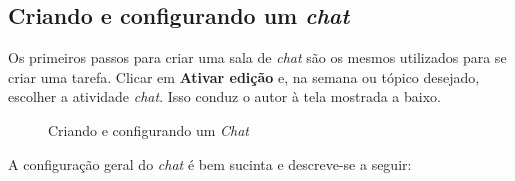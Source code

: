 \subsection{Criando e configurando um \textit{chat}}

Os primeiros passos para criar uma sala de \textit{chat }são os mesmos utilizados para se criar uma tarefa. Clicar em \textbf{Ativar edição} e, na semana ou tópico desejado, escolher a atividade \textit{chat}. Isso conduz o autor à tela mostrada a baixo.

\begin{figure}[htbp]
 \begin{center}
  \caption{Criando e configurando um \textit{Chat}}
  \label{fig:cap5_12}
 \end{center}
\end{figure}

A configuração geral do \textit{chat} é bem sucinta e descreve-se a seguir:


